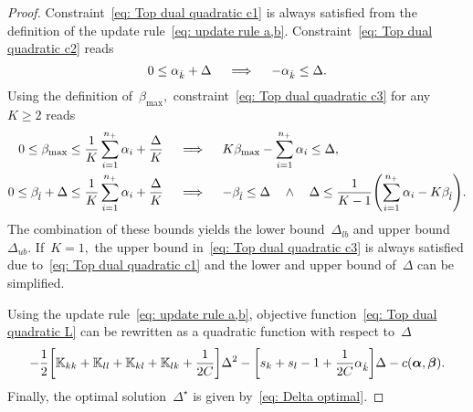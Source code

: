\begin{proof}
  Constraint~\eqref{eq: Top dual quadratic c1} is always satisfied from the definition of the update rule~\eqref{eq: update rule a,b}. Constraint~\eqref{eq: Top dual quadratic c2} reads
  \begin{equation*}
    0 \leq \alpha_{\hat{k}} + \Delta
    \quad \implies \quad
    - \alpha_{\hat{k}} \leq \Delta.
  \end{equation*}
  Using the definition of~$\beta_{\max},$ constraint~\eqref{eq: Top dual quadratic c3} for any~$K \geq 2$ reads
  \begin{align*}
    0 \leq \beta_{\max} \leq \frac{1}{K} \sum_{i = 1}^{\npos} \alpha_i + \frac{\Delta}{K} 
    & \quad \implies \quad
    K\beta_{\max} - \sum_{i = 1}^{\npos} \alpha_i \leq \Delta, \\
    0 \leq \betal + \Delta \leq \frac{1}{K} \sum_{i = 1}^{\npos} \alpha_i + \frac{\Delta}{K}
    & \quad \implies \quad
    -\betal \leq \Delta \quad \land \quad \Delta \leq \frac{1}{K-1}\Brac{\sum_{i = 1}^{\npos} \alpha_i - K \betal}.
  \end{align*}
  The combination of these bounds yields the lower bound~$\Delta_{lb}$ and upper bound~$\Delta_{ub}.$ If~$K = 1,$ the upper bound in~\eqref{eq: Top dual quadratic c3} is always satisfied due to~\eqref{eq: Top dual quadratic c1} and the lower and upper bound of~$\Delta$ can be simplified.
  
  Using the update rule~\eqref{eq: update rule a,b}, objective function~\eqref{eq: Top dual quadratic L} can be rewritten as a quadratic function with respect to~$\Delta$
  \begin{equation*}
    - \frac{1}{2} \Brac[s]{\K_{kk} + \K_{ll} + \K_{kl} + \K_{lk} + \frac{1}{2C}} \Delta^2
    - \Brac[s]{s_k + s_l - 1 + \frac{1}{2C} \alphak} \Delta
    - c(\bm{\alpha}, \bm{\beta}).
  \end{equation*}
  Finally, the optimal solution~$\Delta^{\star}$ is given by~\eqref{eq: Delta optimal}.
\end{proof}

